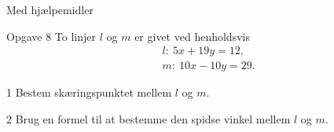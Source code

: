 %
%
%
%
\newpage
\begin{center}
	\LARGE
	Med hjælpemidler
\end{center}
%
%
%
\begin{opgavetekst}{Opgave 8}
	To linjer $l$ og $m$ er givet ved henholdsvis
	\begin{align*}
		&l: \ 5x + 19y = 12, \\
		&m: \ 10x -10y = 29.
	\end{align*}
\end{opgavetekst}
\begin{delopgave}{1}
	Bestem skæringspunktet mellem $l$ og $m$.
\end{delopgave}
\begin{delopgave}{2}
	Brug en formel til at bestemme den spidse vinkel mellem $l$ og $m$.
\end{delopgave}
%